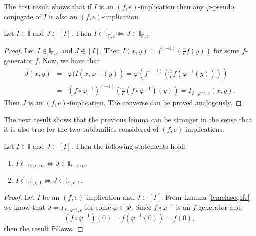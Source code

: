 The first result shows that if $I$ is an $(f,e)$-implication then any $\varphi$-pseudo conjugate of $I$ is also an $(f,e)$-implication.

\begin{lemma} Let $I\in \mathbb{I}$ and $J \in [I]$. Then $ I \in \mathbb{I}_{\mathbb{F},e} \Leftrightarrow J \in \mathbb{I}_{\mathbb{F},e}$.
	\label{lemclaseqIfe}
\end{lemma}
\begin{proof}
	Let $I\in \mathbb{I}_{\mathbb{F},e}$ and $J \in [I]$. Then $I(x,y)=f^{(-1)}(\frac{x}{e}f(y))$ for some $f$-generator $f$. Now, we have that
	\begin{eqnarray*}
	J(x,y) &=& \varphi (I(x,\varphi^{-1}(y)) = \varphi \left(f^{(-1)}\left(\frac{x}{e} f ( \varphi^{-1}(y))\right) \right) \\
	&=& (f \circ \varphi^{-1})^{(-1)}\left(\frac{x}{e}(f \circ \varphi^{-1})(y)\right) = I_{f \circ \varphi^{-1},e}(x,y).
	\end{eqnarray*}
	Then $J$ is an $(f,e)$-implication. The converse can be proved analogously.
\end{proof} 

The next result shows that the previous lemma can be stronger in the sense that it is also true for the two subfamilies considered of $(f,e)$-implications.

\begin{lemma} Let $I \in \mathbb{I}$ and $J \in [I]$. Then the following statements hold:
	\begin{enumerate}[label=(\roman*)]
		\item $I \in \mathbb{I}_{\mathbb{F},e,\infty} \Leftrightarrow J \in \mathbb{I}_{\mathbb{F},e,\infty}$.
		\item $I \in \mathbb{I}_{\mathbb{F},e,1} \Leftrightarrow J \in \mathbb{I}_{\mathbb{F},e,1}$.
	\end{enumerate}
	\label{lemaclas}
\end{lemma}
\begin{proof}
	Let $I$ be an $(f,e)$-implication and $J \in [I]$. From Lemma \ref{lemclaseqIfe} we know that $J=I_{f \circ \varphi^{-1},e}$ for some $\varphi \in \Phi$. Since $ f \circ \varphi^{-1}$ is an $f$-generator and
	$$(f \circ \varphi^{-1})(0)=f(\varphi^{-1}(0))=f(0),$$
	\noindent then the result follows.
\end{proof}


